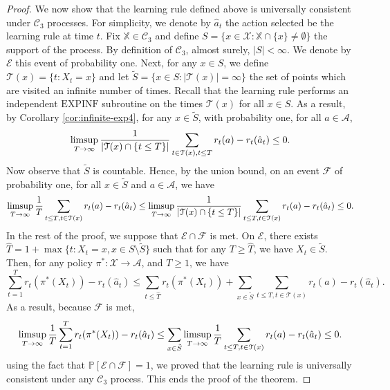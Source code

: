 \documentclass[aos]{imsart}
\theoremstyle{plain}
\theoremstyle{remark}
\newcommand{\Acal}{\mathcal{A}}
\newcommand{\Ccal}{\mathcal{C}}
\newcommand{\Ecal}{\mathcal{E}}
\newcommand{\Fcal}{\mathcal{F}}
\newcommand{\Tcal}{\mathcal{T}}
\newcommand{\Xcal}{\mathcal{X}}
\newcommand{\Pbb}{\mathbb{P}}
\newcommand{\Xbb}{\mathbb{X}}
\newcommand{\1}{\mathbbm{1}}%
\newcommand{\EXPINF}{\mathrm{EXPINF}}
\renewcommand{\limsup}{\mathop{\rm limsup}}
\begin{document}
\begin{proof}
    We now show that the learning rule defined above is universally consistent under $\Ccal_3$ processes. For simplicity, we denote by $\hat a_t$ the action selected be the learning rule at time $t$. Fix $\Xbb\in\Ccal_3$ and define $S = \{x\in\Xcal: \Xbb\cap\{x\}\neq\emptyset\}$ the support of the process. By definition of $\Ccal_3$, almost surely, $|S|<\infty$. We denote by $\Ecal$ this event of probability one. Next, for any $x\in S$, we define $\Tcal(x) = \{t: X_t=x\}$ and let $\tilde S = \{x\in S: |\Tcal(x)|=\infty\}$ the set of points which are visited an infinite number of times. Recall that the learning rule performs an independent $\EXPINF$ subroutine on the times $\Tcal(x)$ for all $x\in S$. As a result, by Corollary \ref{cor:infinite-exp4}, for any $x\in \tilde S$, with probability one, for all $a\in \Acal$,
    \begin{equation*}
        \limsup_{T\to\infty}\frac{1}{|\Tcal(x)\cap\{t\leq T\}|}\sum_{t\in\Tcal(x),t\leq T} r_t(a) - r_t(\hat a_t) \leq 0.
    \end{equation*}
    Now observe that $\tilde S$ is countable. Hence, by the union bound, on an event $\Fcal$ of probability one, for all $x\in \tilde S$ and $a\in \Acal$, we have
    \begin{equation*}
        \limsup_{T\to\infty}\frac{1}{T}\sum_{t\leq T, t\in\Tcal(x)} r_t(a) - r_t(\hat a_t) \leq \limsup_{T\to\infty}\frac{1}{|\Tcal(x)\cap\{t\leq T\}|}\sum_{t\leq T, t\in\Tcal(x)} r_t(a) - r_t(\hat a_t) \leq 0.
    \end{equation*}
    In the rest of the proof, we suppose that $\Ecal\cap\Fcal$ is met. On $\Ecal$, there exists $\hat T = 1+\max \{t: X_t=x,x\in S\setminus \tilde S\}$ such that for any $T\geq \hat T$, we have $X_t\in\tilde S$. Then, for any policy $\pi^*:\Xcal\to\Acal$, and $T\geq 1$, we have
    \begin{equation*}
        \sum_{t=1}^T r_t(\pi^*(X_t))-r_t(\hat a_t) \leq \sum_{t\leq \hat T} r_t(\pi^*(X_t)) + \sum_{x\in \tilde S} \sum_{t\leq T, t\in\Tcal(x)} r_t(a) - r_t(\hat a_t).
    \end{equation*}
    As a result, because $\Fcal$ is met,
    \begin{equation*}
        \limsup_{T\to\infty} \frac{1}{T}\sum_{t=1}^T r_t(\pi^*(X_t))-r_t(\hat a_t) \leq \sum_{x\in \tilde S} \limsup_{T\to\infty} \frac{1}{T} \sum_{t\leq T, t\in\Tcal(x)} r_t(a) - r_t(\hat a_t) \leq 0.
    \end{equation*}
    using the fact that $\Pbb[\Ecal\cap\Fcal]=1$, we proved that the learning rule is universally consistent under any $\Ccal_3$ process. This ends the proof of the theorem.
\end{proof}
\end{document}
